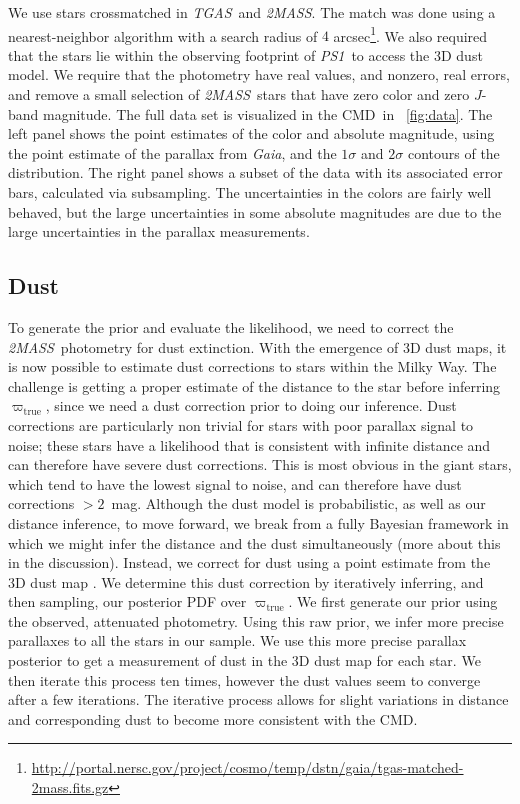 \documentclass[modern]{aastex61}
\newcommand{\acronym}[1]{{\small{#1}}}
\newcommand{\project}[1]{\textsl{#1}}
\newcommand{\tgas}{\project{\acronym{TGAS}}}
\newcommand{\tmass}{\project{\acronym{2MASS}}}
\newcommand{\psone}{\project{\acronym{PS1}}}
\newcommand{\gaia}{\project{Gaia}}
\newcommand{\cmd}{\acronym{CMD}}
\newcommand{\true}{\mathrm{true}}
\begin{document}
We use stars crossmatched in \tgas\ and \tmass.
The match was done using a nearest-neighbor algorithm with a search radius of $4$ arcsec\footnote{\url{http://portal.nersc.gov/project/cosmo/temp/dstn/gaia/tgas-matched-2mass.fits.gz}}.
We also required that the stars lie within the
observing footprint of \psone\ to access the \cite{green15} 3D dust model.
We require that the photometry have real values, and nonzero, real errors, and
remove a small selection of \tmass\ stars that have zero color and zero $J$-band
magnitude.
The full data set is visualized in the \cmd\ in \figurename~\ref{fig:data}.
The left panel shows the point estimates of the color and absolute magnitude,
using the point estimate of the parallax from \gaia, and the $1\sigma$ and
$2\sigma$ contours of the distribution.
The right panel shows a subset of the data with its associated error bars, calculated via subsampling.
The uncertainties in the colors are fairly well behaved, but the large
uncertainties in some absolute magnitudes are due to the large uncertainties in
the parallax measurements.

\subsection{Dust}

To generate the prior and evaluate the likelihood, we need to
correct the \tmass\ photometry for dust extinction.
With the emergence of 3D dust maps, it is now possible to estimate dust
corrections to stars within the Milky Way. The challenge is getting a
proper estimate of the distance to the star before inferring
$\varpi_{\true}$, since we need a dust correction prior to doing our
inference. Dust corrections are particularly non trivial for stars
with poor parallax signal to noise; these stars have
a likelihood that is consistent with infinite distance and can
therefore have severe dust corrections. This is most obvious in the
giant stars, which tend to have the lowest signal to noise, and can
therefore have dust corrections $> 2$~mag. Although the dust
model is probabilistic, as well as our distance inference, to move
forward, we break from a fully Bayesian framework in which we might
infer the distance and the dust simultaneously (more about this in the
discussion). Instead, we correct for dust using a point estimate from
the 3D dust map \citep{green15}. We determine this dust correction by
iteratively inferring, and then sampling, our posterior PDF over
$\varpi_{\true}$. We first generate our prior using the observed,
attenuated photometry. Using this raw prior, we infer more precise
parallaxes to all the stars in our sample. We use this more
precise parallax posterior to get a measurement of dust in the 3D dust
map for each star. We then iterate this process ten times, however
the dust values seem to converge after a few iterations. The
iterative process allows for slight variations in distance and
corresponding dust to become more consistent with the \cmd.
\end{document}
